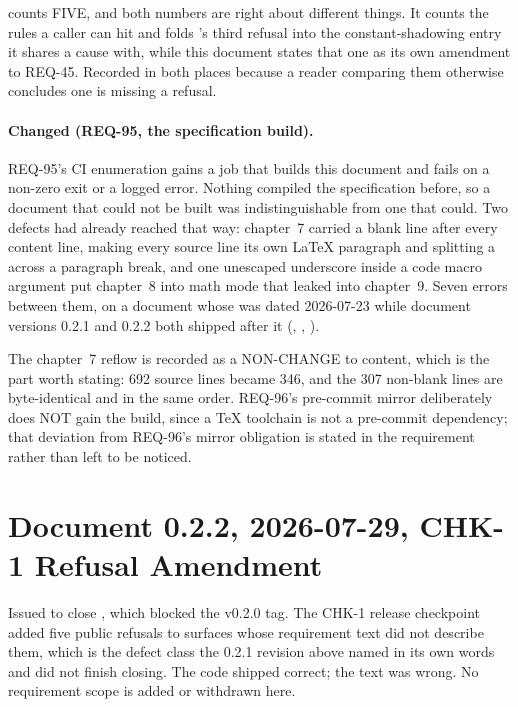  counts FIVE, and both numbers are right about
different things. It counts the rules a caller can hit and folds
's third refusal into the constant-shadowing entry it
shares a cause with, while this document states that one as its own
amendment to REQ-45. Recorded in both places because a reader comparing
them otherwise concludes one is missing a refusal.

\paragraph{Changed (REQ-95, the specification build).} REQ-95's CI
enumeration gains a job that builds this document and fails on a non-zero
exit or a logged error. Nothing compiled the specification before, so a
document that could not be built was indistinguishable from one that
could. Two defects had already reached  that way: chapter~7
carried a blank line after every content line, making every source line
its own LaTeX paragraph and splitting a  across a paragraph
break, and one unescaped underscore inside a code macro argument put chapter~8 into
math mode that leaked into chapter~9. Seven  errors between
them, on a document whose  was dated 2026-07-23 while
document versions 0.2.1 and 0.2.2 both shipped after it
(, ,
).

The chapter~7 reflow is recorded as a NON-CHANGE to content, which is the
part worth stating: 692 source lines became 346, and the 307 non-blank
lines are byte-identical and in the same order. REQ-96's pre-commit mirror
deliberately does NOT gain the build, since a TeX toolchain is not a
pre-commit dependency; that deviation from REQ-96's mirror obligation is
stated in the requirement rather than left to be noticed.

\section*{Document 0.2.2, 2026-07-29, CHK-1 Refusal Amendment}

Issued to close , which blocked the v0.2.0 tag.
The CHK-1 release checkpoint added five public refusals to surfaces
whose requirement text did not describe them, which is the defect class
the 0.2.1 revision above named in its own words and did not finish
closing. The code shipped correct; the text was wrong. No requirement
scope is added or withdrawn here.

